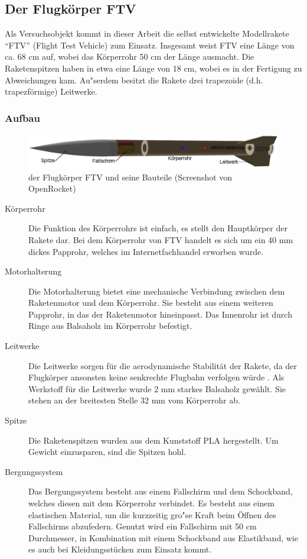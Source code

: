 \documentclass[10pt,a4paper]{article}
\begin{document}
\subsection{Der Flugkörper FTV}

Als Versuchsobjekt kommt in dieser Arbeit die selbst entwickelte Modellrakete "`FTV"' (Flight Test Vehicle) zum Einsatz. Insgesamt weist FTV eine Länge von ca. 68 cm auf, wobei das Körperrohr 50 cm der Länge ausmacht. Die Raketenspitzen haben in etwa eine Länge von 18 cm, wobei es in der Fertigung zu Abweichungen kam. Au"serdem besitzt die Rakete drei trapezoide (d.h. trapezförmige) Leitwerke.


\subsubsection{Aufbau}

\begin{figure}[ht]
	\includegraphics[width=15cm]{Bilder/Bauteile-von-FTV.png}
	\caption{der Flugkörper FTV und seine Bauteile (Screenshot von OpenRocket)}
	\centering
\end{figure}

\begin{description}
	\item[Körperrohr] Die Funktion des Körperrohrs ist einfach, es stellt den Hauptkörper der Rakete dar. Bei dem Körperrohr von FTV handelt es sich um ein 40 mm dickes Papprohr, welches im Internetfachhandel erworben wurde.
	
	\item[Motorhalterung] Die Motorhalterung bietet eine mechanische Verbindung zwischen dem Raketenmotor und dem Körperrohr. Sie besteht aus einem weiteren Papprohr, in das der Raketenmotor hineinpasst. Das Innenrohr ist durch Ringe aus Balsaholz im Körperrohr befestigt.
	
	\item[Leitwerke] Die Leitwerke sorgen für die aerodynamische Stabilität der Rakete, da der Flugkörper ansonsten keine senkrechte Flugbahn verfolgen würde \cite{om}. Als Werkstoff für die Leitwerke wurde 2 mm starkes Balsaholz gewählt. Sie stehen an der breitesten Stelle 32 mm vom Körperrohr ab.
	
	\item[Spitze] Die Raketenspitzen wurden aus dem Kunststoff PLA hergestellt. Um Gewicht einzusparen, sind die Spitzen hohl.
	
	\item[Bergungssystem] Das Bergungssystem besteht aus einem Fallschirm und dem Schockband, welches diesen mit dem Körperrohr verbindet. Es besteht aus einem elastischen Material, um die kurzzeitig gro"se Kraft beim Öffnen des Fallschirms abzufedern. Genutzt wird ein Fallschirm mit 50 cm Durchmesser, in Kombination mit einem Schockband aus Elastikband, wie es auch bei Kleidungsstücken zum Einsatz kommt.
\end{description}
\end{document}
